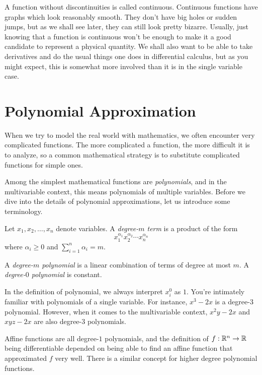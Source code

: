   A function without discontinuities is called continuous.
Continuous functions have graphs which look reasonably 
smooth.  They don't have big holes or sudden jumps,
 but as we shall see later, they can still look pretty
bizarre.   Usually, just knowing that a function is continuous
won't be enough to make it a good candidate to represent a
physical quantity.  We shall also want to be able to take
derivatives and do the usual things one does in differential
calculus, but as you might expect, this is somewhat more involved
than it is in the single variable case. 


\begin{exercises}
\end{exercises}

\section{Polynomial Approximation}

When we try to model the real world with mathematics, we often
encounter very complicated functions.  The more complicated
a function, the more difficult it is to analyze, so a common mathematical
strategy is to substitute complicated functions for simple ones.

Among the simplest mathematical functions are \emph{polynomials}, and in the
multivariable context, this means polynomials of multiple variables.
Before we dive into the details of polynomial approximations, let us
introduce some terminology.

\begin{definition}[Polynomial]
	Let $x_1,x_2,\ldots,x_n$ denote variables.  A \emph{degree-$m$ term}
	is a product of the form
	\[
		x_1^{\alpha_1}x_2^{\alpha_2}\cdots x_n^{\alpha_n}
	\]
	where $\alpha_i\geq 0$ and $\sum_{i=1}^n \alpha_i = m$.

	A \emph{degree-$m$ polynomial} is a linear combination
	of terms of degree at most $m$.  A \emph{degree-$0$ polynomial} is constant.
\end{definition}

In the definition of polynomial, we always interpret $x_i^{0}$ as $1$.  You're intimately
familiar with polynomials of a single variable.  For instance, $x^3-2x$ is a degree-$3$ 
polynomial.  However, when it comes to the multivariable context, $x^2y-2x$ and $xyz-2x$ are
also degree-$3$ polynomials.

Affine functions are all degree-$1$ polynomials, and the definition of 
$f:\mathbb{R}^n\to\mathbb{R}$ being differentiable
depended on being able to find an affine function that approximated $f$ very well.
There is a similar concept for higher degree polynomial functions.

